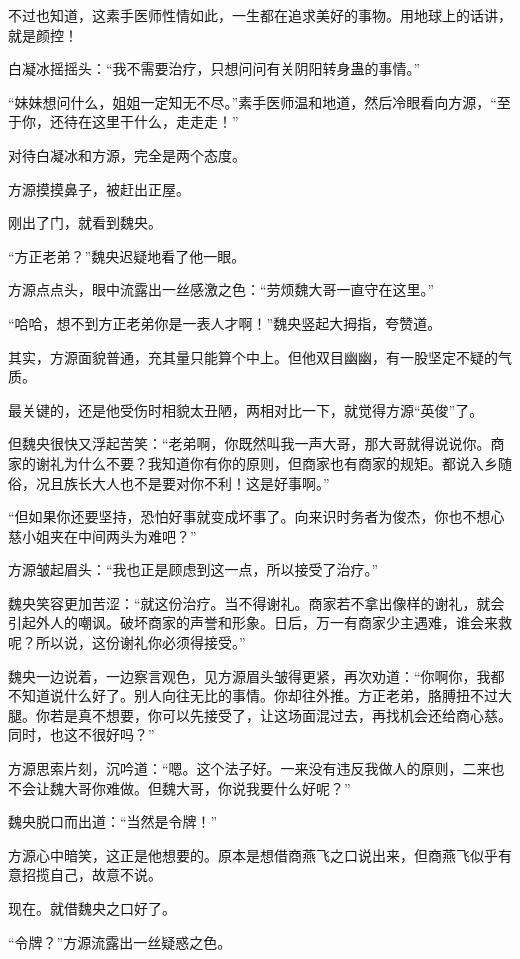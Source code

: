 \begin{this_body}
不过也知道，这素手医师性情如此，一生都在追求美好的事物。用地球上的话讲，就是颜控！

白凝冰摇摇头：“我不需要治疗，只想问问有关阴阳转身蛊的事情。”

“妹妹想问什么，姐姐一定知无不尽。”素手医师温和地道，然后冷眼看向方源，“至于你，还待在这里干什么，走走走！”

对待白凝冰和方源，完全是两个态度。

方源摸摸鼻子，被赶出正屋。

刚出了门，就看到魏央。

“方正老弟？”魏央迟疑地看了他一眼。

方源点点头，眼中流露出一丝感激之色：“劳烦魏大哥一直守在这里。”

“哈哈，想不到方正老弟你是一表人才啊！”魏央竖起大拇指，夸赞道。

其实，方源面貌普通，充其量只能算个中上。但他双目幽幽，有一股坚定不疑的气质。

最关键的，还是他受伤时相貌太丑陋，两相对比一下，就觉得方源“英俊”了。

但魏央很快又浮起苦笑：“老弟啊，你既然叫我一声大哥，那大哥就得说说你。商家的谢礼为什么不要？我知道你有你的原则，但商家也有商家的规矩。都说入乡随俗，况且族长大人也不是要对你不利！这是好事啊。”

“但如果你还要坚持，恐怕好事就变成坏事了。向来识时务者为俊杰，你也不想心慈小姐夹在中间两头为难吧？”

方源皱起眉头：“我也正是顾虑到这一点，所以接受了治疗。”

魏央笑容更加苦涩：“就这份治疗。当不得谢礼。商家若不拿出像样的谢礼，就会引起外人的嘲讽。破坏商家的声誉和形象。日后，万一有商家少主遇难，谁会来救呢？所以说，这份谢礼你必须得接受。”

魏央一边说着，一边察言观色，见方源眉头皱得更紧，再次劝道：“你啊你，我都不知道说什么好了。别人向往无比的事情。你却往外推。方正老弟，胳膊扭不过大腿。你若是真不想要，你可以先接受了，让这场面混过去，再找机会还给商心慈。同时，也这不很好吗？”

方源思索片刻，沉吟道：“嗯。这个法子好。一来没有违反我做人的原则，二来也不会让魏大哥你难做。但魏大哥，你说我要什么好呢？”

魏央脱口而出道：“当然是令牌！”

方源心中暗笑，这正是他想要的。原本是想借商燕飞之口说出来，但商燕飞似乎有意招揽自己，故意不说。

现在。就借魏央之口好了。

“令牌？”方源流露出一丝疑惑之色。


\end{this_body}
